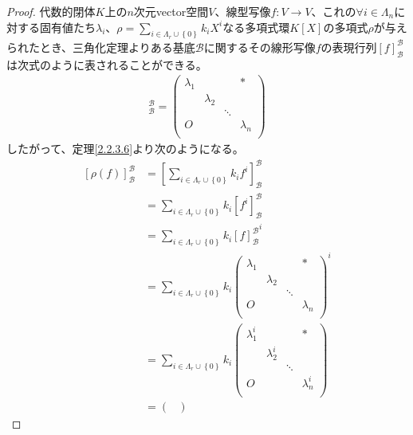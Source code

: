 \documentclass[dvipdfmx]{jsarticle}
\begin{document}
\begin{proof}
代数的閉体$K$上の$n$次元vector空間$V$、線型写像$f:V \rightarrow V$、これの$\forall i \in \varLambda_{n}$に対する固有値たち$\lambda_{i}$、$\rho = \sum_{i \in \varLambda_{r} \cup \left\{ 0 \right\}} {k_{i}X^{i}}$なる多項式環$K[ X]$の多項式$\rho$が与えられたとき、三角化定理よりある基底$\mathcal{B}$に関するその線形写像$f$の表現行列$[ f]_{\mathcal{B}}^{\mathcal{B}}$は次式のように表されることができる。
\begin{align*}
[ f]_{\mathcal{B}}^{\mathcal{B}} = \begin{pmatrix}
\lambda_{1} & \  & \  & * \\
\  & \lambda_{2} & \  & \  \\
\  & \  & \ddots & \  \\
O & \  & \  & \lambda_{n} \\
\end{pmatrix}
\end{align*}
したがって、定理\ref{2.2.3.6}より次のようになる。
\begin{align*}
\left[ \rho(f) \right]_{\mathcal{B}}^{\mathcal{B}} &= \left[ \sum_{i \in \varLambda_{r} \cup \left\{ 0 \right\}} {k_{i}f^{i}} \right]_{\mathcal{B}}^{\mathcal{B}}\\
&= \sum_{i \in \varLambda_{r} \cup \left\{ 0 \right\}} {k_{i}\left[ f^{i} \right]_{\mathcal{B}}^{\mathcal{B}}}\\
&= \sum_{i \in \varLambda_{r} \cup \left\{ 0 \right\}} {k_{i}{[ f]_{\mathcal{B}}^{\mathcal{B}}}^{i}}\\
&= \sum_{i \in \varLambda_{r} \cup \left\{ 0 \right\}} {k_{i}\begin{pmatrix}
\lambda_{1} & \  & \  & * \\
\  & \lambda_{2} & \  & \  \\
\  & \  & \ddots & \  \\
O & \  & \  & \lambda_{n} \\
\end{pmatrix}^{i}}\\
&= \sum_{i \in \varLambda_{r} \cup \left\{ 0 \right\}} {k_{i}\begin{pmatrix}
\lambda_{1}^{i} & \  & \  & * \\
\  & \lambda_{2}^{i} & \  & \  \\
\  & \  & \ddots & \  \\
O & \  & \  & \lambda_{n}^{i} \\
\end{pmatrix}}\\
&= \begin{pmatrix}

\end{pmatrix}
\end{align*}
\end{proof}
\end{document}
